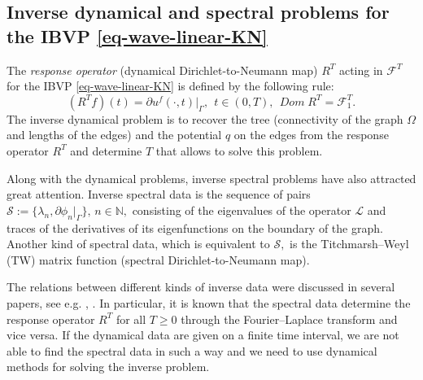 \documentclass[11pt]{amsart}
\theoremstyle{definition}
\theoremstyle{plain}
\numberwithin{equation}{section}
\newcommand\Ga{\Gamma}
\newcommand\Om{\Omega}
\begin{document}
\subsection{Inverse dynamical and spectral problems for the IBVP \eqref{eq-wave-linear-KN}}
The {\it response operator} (dynamical Dirichlet-to-Neumann map) $R^T$ acting in $\mathcal{F}^T$ for the IBVP \eqref{eq-wave-linear-KN} is defined by the following rule:
 \begin{equation} \label{response}
(R^Tf)(t)=\partial u^f(\cdot,t)|_{\Ga}, \ \ t \in (0,T), \ \ Dom \; R^T = \mathcal{F}^T_1.
 \end{equation}
 The inverse dynamical problem is to recover the tree (connectivity of the graph $\Om$ and lengths of the edges) and the potential $q$ on the edges from the response operator $R^T$ and
determine  $T$ that allows to solve this problem.

Along with the dynamical problems, inverse spectral problems have also attracted great attention. 
Inverse spectral data is the sequence of pairs $\mathcal{S}:=\{\lambda_n,
\partial \phi_n|_{\Ga}\},\, n \in \mathbb{N},$ consisting of the eigenvalues of the operator $\mathcal{L}$
and traces of the derivatives of its eigenfunctions on the boundary of the graph. Another kind of spectral data, which is equivalent to $\mathcal{S},$ is the Titchmarsh--Weyl (TW) matrix function (spectral Dirichlet-to-Neumann map). 

The relations between different kinds of inverse data were discussed in several papers, see e.g. \cite{KKLM}, \cite{AK08}. In particular, it is known that the spectral data determine the response operator $R^T$ for all $T \geq 0$ through the Fourier--Laplace transform and vice versa. 
If the dynamical data are given on a finite time interval, we are not able to find the spectral data in such a way and we need to use dynamical methods for solving the inverse problem.
\end{document}
